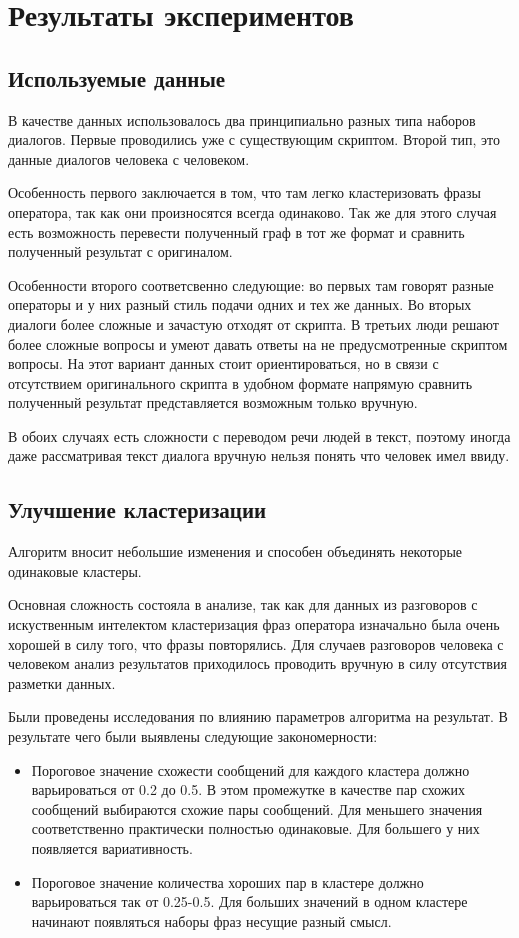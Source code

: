\documentclass[specification,annotation]{itmo-student-thesis}
\begin{document}
	
	\chapter{Результаты экспериментов}
	\section{Используемые данные}
	В качестве данных использовалось два принципиально разных типа наборов диалогов. Первые проводились уже с существующим скриптом. Второй тип, это данные диалогов человека с человеком.
	
	Особенность первого заключается в том, что там легко кластеризовать фразы оператора, так как они произносятся всегда одинаково. Так же для этого случая есть возможность перевести полученный граф в тот же формат и сравнить полученный результат с оригиналом.
	
	Особенности второго соответсвенно следующие: во первых там говорят разные операторы и у них разный стиль подачи одних и тех же данных. Во вторых диалоги более сложные и зачастую отходят от скрипта. В третьих люди решают более сложные вопросы и умеют давать ответы на не предусмотренные скриптом вопросы. На этот вариант данных стоит ориентироваться, но в связи с отсутствием оригинального скрипта в удобном формате напрямую сравнить полученный результат представляется возможным только вручную.
	
	В обоих случаях есть сложности с переводом речи людей в текст, поэтому иногда даже рассматривая текст диалога вручную нельзя понять что человек имел ввиду.
	
	\section{Улучшение кластеризации}
	Алгоритм вносит небольшие изменения и способен объединять некоторые одинаковые кластеры. 
	
	Основная сложность состояла в анализе, так как для данных из разговоров с искуственным интелектом кластеризация фраз оператора изначально была очень хорошей в силу того, что фразы повторялись. Для случаев разговоров человека с человеком анализ результатов приходилось проводить вручную в силу отсутствия разметки данных.
	
	Были проведены исследования по влиянию параметров алгоритма на результат. В результате чего были выявлены следующие закономерности: 
	\begin{itemize}
	\item Пороговое значение схожести сообщений для каждого кластера должно варьироваться от 0.2 до 0.5. В этом промежутке в качестве пар схожих сообщений выбираются схожие пары сообщений. Для меньшего значения соответственно практически полностью одинаковые. Для большего у них  появляется вариативность.
	\item Пороговое значение количества хороших пар в кластере должно варьироваться так от 0.25-0.5. Для больших значений в одном кластере начинают появляться наборы фраз несущие разный смысл.
	\end{itemize}
		
\end{document}
